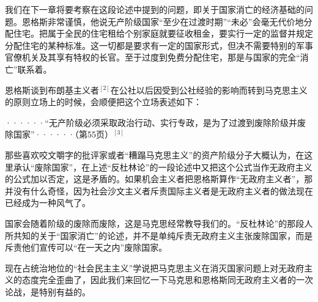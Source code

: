 我们在下一章将要考察在这段论述中提到的问题，即关于国家消亡的经济基础的问题。恩格斯非常谨慎，他说无产阶级国家“至少在过渡时期”“未必”会毫无代价地分配住宅。把属于全民的住宅租给个别家庭就要征收租金，要实行一定的监督并规定分配住宅的某种标准。这一切都是要求有一定的国家形式，但决不需要特别的军事官僚机关及其享有特权的长官。至于过度到免费分配住宅，那是与国家的完全“消亡”联系着。

恩格斯谈到布朗基主义者$^{[2]}$在公社以后因受到公社经验的影响而转到马克思主义的原则立场上的时候，会顺便把这个立场表述如下：

\pskip
\leftskip=10mm
\small

······“无产阶级必须采取政治行动、实行专政，是为了过渡到废除阶级并废除国家”······（第55页）$^{[3]}$

\normalsize
\leftskip=0mm
\pskip
{}

那些喜欢咬文嚼字的批评家或者“糟蹋马克思主义”的资产阶级分子大概认为，在这里{\kaishu 承认}“废除国家”，在上述“反杜林论”的一段论述中又把这个公式当作无政府主义的公式加以否定，这是矛盾的。如果机会主义者把恩格斯算作“无政府主义者”，那并没有什么奇怪，因为社会沙文主义者斥责国际主义者是无政府主义者的做法现在已经成为一种风气了。

国家会随着阶级的废除而废除，这是马克思经常教导我们的。“反杜林论”的那段人所共知的关于“国家消亡”的论述，并不是单纯斥责无政府主义主张废除国家，而是斥责他们宣传可以“在一天之内”废除国家。

现在占统治地位的“社会民主主义”学说把马克思主义在消灭国家问题上对无政府主义的态度完全歪曲了，因此我们来回忆一下马克思和恩格斯同无政府主义者的一次论战，是特别有益的。


